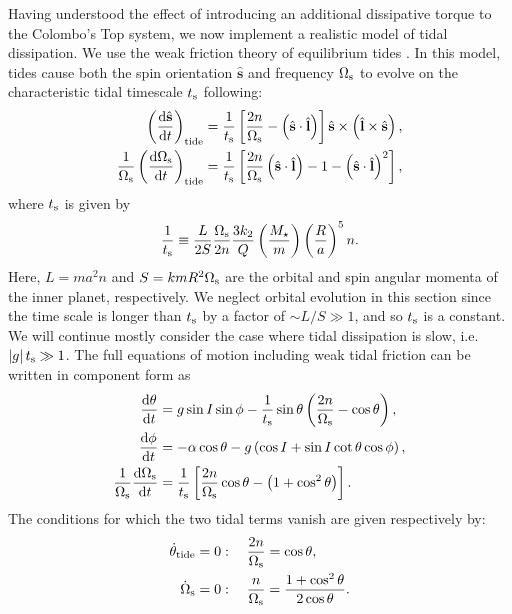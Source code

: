 \documentclass[
        fleqn,
        usenatbib,
    ]{mnras}
\newcommand*{\rd}[2]{\frac{\mathrm{d}#1}{\mathrm{d}#2}}
\newcommand*{\abs}[1]{\left|#1\right|}
\newcommand*{\p}[1]{\left(#1\right)}
\newcommand*{\s}[1]{\left[#1\right]}
\newcommand*{\uv}[1]{\hat{\mathbf{#1}}}
\begin{document}
Having understood the effect of introducing an additional dissipative torque to
the Colombo's Top system, we now implement a realistic model of tidal
dissipation. We use the weak friction theory of equilibrium tides
\citep{lai2012}. In this model, tides cause both the spin orientation $\uv{s}$
and frequency $\Omega_{\rm s}$ to evolve on the characteristic tidal timescale
$t_{\rm s}$ following:
\begin{align}
    \p{\rd{\uv{s}}{t}}_{\rm tide} &= \frac{1}{t_{\rm s}}
                \s{\frac{2n}{\Omega_{\rm s}} - \p{\uv{s} \cdot \uv{l}}}
                    \uv{s} \times \p{\uv{l} \times \uv{s}}\label{eq:dsdt_tide},\\
    \frac{1}{\Omega_{\rm s}}\p{\rd{\Omega_{\rm s}}{t}}_{\rm tide}
        &= \frac{1}{t_{\rm s}} \s{\frac{2n}{\Omega_{\rm s}}\p{\uv{s} \cdot
            \uv{l}} - 1 - \p{\uv{s} \cdot \uv{l}}^2},\label{eq:dWsdt_tide}
\end{align}
where $t_{\rm s}$ is given by
\begin{equation}
    \frac{1}{t_{\rm s}} \equiv \frac{L}{2S} \frac{\Omega_{\rm
        s}}{2n}\frac{3k_2}{Q}\p{\frac{M_\star}{m}}\p{\frac{R}{a}}^5 n.
\end{equation}
Here, $L = ma^2n$ and $S = kmR^2 \Omega_{\rm s}$ are the orbital and spin
angular momenta of the inner planet, respectively. We neglect orbital evolution
in this section since the time scale is longer than $t_{\rm s}$ by a factor of
$\sim L / S \gg 1$, and so $t_{\rm s}$ is a constant. We will continue mostly
consider the case where tidal dissipation is slow, i.e.\ $\abs{g}t_{\rm s} \gg
1$. The full equations of motion including weak tidal friction can be written in
component form as
\begin{align}
    \rd{\theta}{t} &= g\sin I \sin \phi -
        \frac{1}{t_{\rm s}}\sin \theta\p{\frac{2n}{\Omega_{\rm s}} - \cos \theta}
            ,\label{eq:ds_fullq}\\
    \rd{\phi}{t} &= -\alpha\cos\theta
        - g\p{\cos I + \sin I \cot \theta \cos \phi}\label{eq:ds_fullphi},\\
    \frac{1}{\Omega_{\rm s}}\rd{\Omega_{\rm s}}{t}
        &= \frac{1}{t_{\rm s}} \s{\frac{2n}{\Omega_{\rm s}} \cos \theta
            - \p{1 + \cos^2\theta}}\label{eq:ds_fulls}.
\end{align}
The conditions for which the two tidal terms vanish are given respectively by:
\begin{align}
    \dot{\theta}_{\rm tide} = 0 &: \quad \frac{2n}{\Omega_{\rm s}} = \cos \theta,
        \label{eq:weaktide_dqzero}\\
    \dot{\Omega}_{\rm s} = 0 &: \quad \frac{n}{\Omega_{\rm s}}
        = \frac{1 + \cos^2\theta}{2\cos \theta}.\label{eq:weaktide_dWszero}
\end{align}
\end{document}
